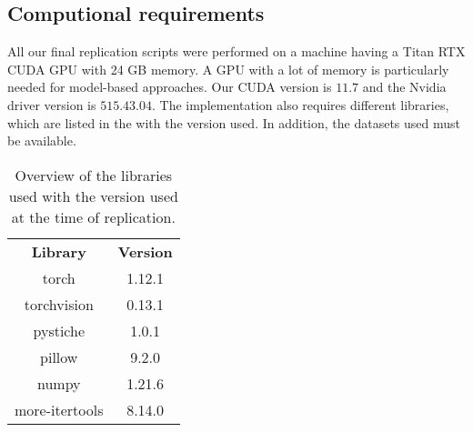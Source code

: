 \subsection{Computional requirements}

All our final replication scripts were performed on a machine having a Titan RTX CUDA GPU with 24 GB memory. A GPU with a lot of memory is particularly needed for model-based approaches. Our CUDA version is $11.7$ and the Nvidia driver version is $515.43.04$. The implementation also requires different libraries, which are listed in the   with the version used. In addition, the datasets used must be available. 

\begin{table*}[h]
	\caption{Overview of the libraries used with the version used at the time of replication.}
	\label{tab:libraries}
	\centering
	\small
	\begin{tabular}{c|c}
		\hline
		\bfseries Library & \bfseries Version\\
		torch & 1.12.1\\
		torchvision &  0.13.1\\
		pystiche & 1.0.1\\
		pillow & 9.2.0\\
		numpy & 1.21.6\\
		more-itertools & 8.14.0\\
		\hline
	\end{tabular}
\end{table*}